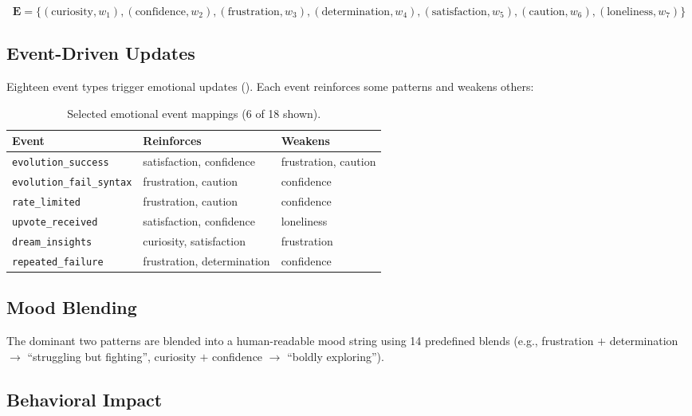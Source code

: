\documentclass[11pt,a4paper]{article}
\begin{document}
\begin{equation}
\mathbf{E} = \{(\text{curiosity}, w_1), (\text{confidence}, w_2), (\text{frustration}, w_3), (\text{determination}, w_4), (\text{satisfaction}, w_5), (\text{caution}, w_6), (\text{loneliness}, w_7)\}
\end{equation}

\subsection{Event-Driven Updates}

Eighteen event types trigger emotional updates (). Each event reinforces some patterns and weakens others:

\begin{table}[H]
\centering
\caption{Selected emotional event mappings (6 of 18 shown).}
\label{tab:emotions}
\begin{tabular}{@{}lll@{}}
\toprule
\textbf{Event} & \textbf{Reinforces} & \textbf{Weakens} \\
\midrule
\texttt{evolution\_success} & satisfaction, confidence & frustration, caution \\
\texttt{evolution\_fail\_syntax} & frustration, caution & confidence \\
\texttt{rate\_limited} & frustration, caution & confidence \\
\texttt{upvote\_received} & satisfaction, confidence & loneliness \\
\texttt{dream\_insights} & curiosity, satisfaction & frustration \\
\texttt{repeated\_failure} & frustration, determination & confidence \\
\bottomrule
\end{tabular}
\end{table}

\subsection{Mood Blending}

The dominant two patterns are blended into a human-readable mood string using 14 predefined blends (e.g., frustration $+$ determination $\rightarrow$ ``struggling but fighting'', curiosity $+$ confidence $\rightarrow$ ``boldly exploring'').

\subsection{Behavioral Impact}
\end{document}
